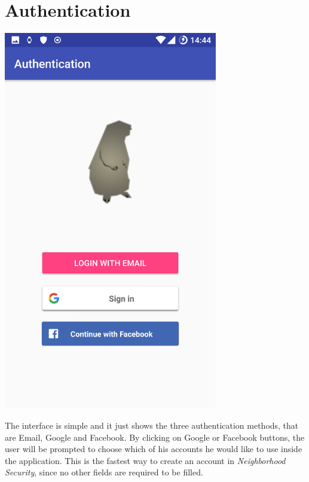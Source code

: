 \documentclass[a4paper]{scrreprt}
\begin{document}
\section{Authentication}
\begin{minipage}{0.5\textwidth}
	\centering
	\includegraphics[width=0.7\textwidth]{imgs/authentication}
\end{minipage}
\begin{minipage}{0.5\textwidth}
	The interface is simple and it just shows the three authentication methods, that are Email, Google and Facebook.
	By clicking on Google or Facebook buttons, the user will be prompted to choose which of his accounts he would like to use inside the application. This is the fastest way to create an account in \emph{Neighborhood Security}, since no other fields are required to be filled.
\end{minipage}
\end{document}
